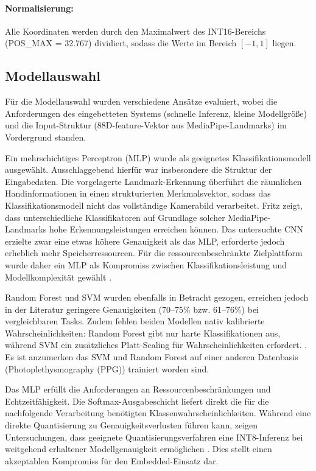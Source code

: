 \paragraph{Normalisierung:} Alle Koordinaten werden durch den Maximalwert des INT16-Bereichs \linebreak (POS\_MAX = 32.767) dividiert, sodass die Werte im Bereich \([{-}1, 1]\) liegen.

\subsection{Modellauswahl}\label{sub:modellauswahl}

Für die Modellauswahl wurden verschiedene Ansätze evaluiert, wobei die Anforderungen des eingebetteten Systems (schnelle Inferenz, kleine Modellgröße) und die Input-Struktur (88D-feature-Vektor aus MediaPipe-Landmarks) im Vordergrund standen.

Ein mehrschichtiges Perceptron (MLP) wurde als geeignetes Klassifikationsmodell ausgewählt. Ausschlaggebend hierfür war insbesondere die Struktur der Eingabedaten. Die vorgelagerte Landmark-Erkennung überführt die räumlichen Handinformationen in einen strukturierten Merkmalsvektor, sodass das Klassifikationsmodell nicht das vollständige Kamerabild verarbeitet. Fritz zeigt, dass unterschiedliche Klassifikatoren auf Grundlage solcher MediaPipe-Landmarks hohe Erkennungsleistungen erreichen können. Das untersuchte CNN erzielte zwar eine etwas höhere Genauigkeit als das MLP, erforderte jedoch erheblich mehr Speicherressourcen. Für die ressourcenbeschränkte Zielplattform wurde daher ein MLP als Kompromiss zwischen Klassifikationsleistung und Modellkomplexität gewählt \cite[S. 57 ff.]{fritzHandGestureRecognition}.

Random Forest und SVM wurden ebenfalls in Betracht gezogen, erreichen jedoch in der Literatur geringere Genauigkeiten (70–75\% bzw. 61–76\%) bei vergleichbaren Tasks. Zudem fehlen beiden Modellen nativ kalibrierte Wahrscheinlichkeiten: Random Forest gibt nur harte Klassifikationen aus, während SVM ein zusätzliches Platt-Scaling für Wahrscheinlichkeiten erfordert. \cite{rahmanComparisonSVMRandom2025}. Es ist anzumerken das SVM und Random Forest auf einer anderen Datenbasis (Photoplethysmography (PPG)) trainiert worden sind.

Das MLP erfüllt die Anforderungen an Ressourcenbeschränkungen und Echtzeitfähigkeit.
Die Softmax-Ausgabeschicht liefert direkt die für die nachfolgende Verarbeitung benötigten
Klassenwahrscheinlichkeiten. Während eine direkte Quantisierung zu Genauigkeitsverlusten
führen kann, zeigen Untersuchungen, dass geeignete Quantisierungsverfahren eine
INT8-Inferenz bei weitgehend erhaltener Modellgenauigkeit ermöglichen
\cite{jacobQuantizationTrainingNeural2018}. Dies stellt einen akzeptablen Kompromiss
für den Embedded-Einsatz dar.

